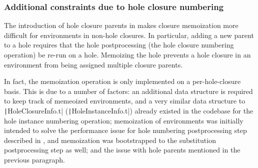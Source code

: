 \subsubsection{Additional constraints due to hole closure numbering}
\label{sec:difficulties-hole-numbering}

The introduction of hole closure parents in  makes closure memoization more difficult for environments in non-hole closures. In particular, adding a new parent to a hole requires that the hole postprocessing (the hole closure numbering operation) be re-run on a hole. Memoizing the hole prevents a hole closure in an environment from being assigned multiple closure parents.

In fact, the memoization operation is only implemented on a per-hole-closure basis. This is due to a number of factors: an additional data structure is required to keep track of memeoized environments, and a very similar data structure to \texttt|HoleClosureInfo.t| (\texttt|HoleInstanceInfo.t|) already existed in the codebase for the hole instance numbering operation; memoization of environments was initially intended to solve the performance issue for hole numbering postprocessing step described in , and memoization was bootstrapped to the substitution postprocessing step as well; and the issue with hole parents mentioned in the previous paragraph.

